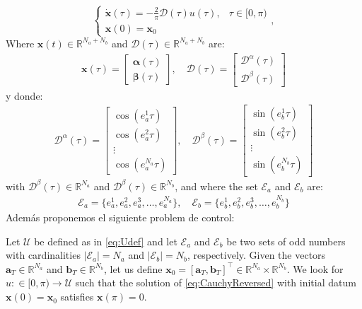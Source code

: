 \begin{equation}\label{eq:CauchyReversed}
    \begin{cases}
        \displaystyle\dot{\bm{x}}(\tau) = -\frac 2\pi\bm{\mathcal{D}}(\tau)u(\tau),  & \tau \in [0,\pi)
        \\[6pt]
        \bm{x}(0) = \bm{x}_0
    \end{cases},
\end{equation}
Where $\bm{x}(t) \in \mathbb{R}^{N_a + N_b}$ and $\bm{\mathcal{D}}(\tau) \in  \mathbb{R}^{N_a + N_b}$ are:
\begin{align*}
	\bm{x}(\tau) = \begin{bmatrix} \bm{\alpha}(\tau) \\ \bm{\beta}(\tau) \end{bmatrix}, \quad
	\bm{\mathcal{D}}(\tau) = \begin{bmatrix} \bm{\mathcal{D}}^\alpha(\tau) \\ \bm{\mathcal{D}}^\beta(\tau) \end{bmatrix}     
\end{align*}
y donde:
\begin{align*}
	\bm{\mathcal{D}}^\alpha(\tau) = 
	\begin{bmatrix} 
		\cos(e_a^1\tau) \\ \cos(e_a^2\tau) \\ \vdots \\ \cos(e_a^{N_a}\tau) 
	\end{bmatrix},
	\quad \bm{\mathcal{D}}^\beta(\tau) = 
	\begin{bmatrix} 
		\sin(e_b^1\tau) \\ \sin(e_b^2\tau) \\ \vdots \\ \sin(e_b^{N_b}\tau) 
	\end{bmatrix} 
\end{align*}
with $\bm{\mathcal{D}}^\beta(\tau) \in \mathbb{R}^{N_a} $ and $ \bm{\mathcal{D}}^\beta(\tau) \in \mathbb{R}^{N_b}$, and where the set $\mathcal{E}_a$ and $\mathcal{E}_b$ are:
\begin{align*}
	\mathcal{E}_a = \{e_a^1,e_a^2,e_a^3,\dots,e_a^{N_a}\}, \quad \mathcal{E}_b = \{e_b^1,e_b^2,e_b^3,\dots,e_b^{N_b}\}    
\end{align*}
%
Además proponemos el siguiente problem de control:
\vspace{1em}
\begin{problem}\label{pb:SHEpControl}
    Let $\mathcal{U}$ be defined as in \eqref{eq:Udef} and let $\mathcal{E} _a $ and $\mathcal{E} _b $ be two sets of odd numbers with cardinalities $|\mathcal{E}_a| = N_a $ and $ |\mathcal{E} _b| = N_b$, respectively. Given the vectors $\bm{a}_T \in \mathbb{R}^{N_a}$ and $\bm{b}_T \in \mathbb{R}^{N_b} $, let us define $\bm{x}_0=[\bm{a}_T,\bm{b}_T]^\top \in \mathbb{R}^{N_a}\times\mathbb{R}^{N_b}$. We look for $u:\in [0,\pi)\to\mathcal{U}$ such that the solution of \eqref{eq:CauchyReversed} with initial datum $\bm{x}(0)=\bm{x}_0$ satisfies $\bm{x}(\pi)=0$.
\end{problem}
\vspace{1em}

